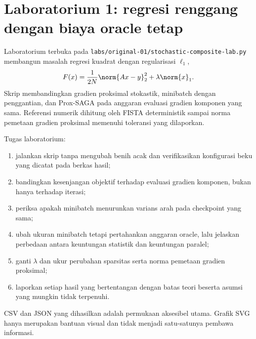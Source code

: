 \section{Laboratorium 1: regresi renggang dengan biaya oracle tetap}
\label{orig01:section:lab}

Laboratorium terbuka pada
\texttt{labs/original-01/stochastic-composite-lab.py} membangun masalah
regresi kuadrat dengan regularisasi $\ell_1$,
\begin{equation}
  \label{orig01:eq:lab-objective}
  F(x)=\frac{1}{2N}\norm{Ax-y}_2^2+\lambda\norm{x}_1.
\end{equation}
Skrip membandingkan gradien proksimal stokastik, minibatch dengan penggantian,
dan Prox-SAGA pada anggaran evaluasi gradien komponen yang sama. Referensi
numerik dihitung oleh FISTA deterministik sampai norma pemetaan gradien
proksimal memenuhi toleransi yang dilaporkan.

Tugas laboratorium:
\begin{enumerate}
  \item jalankan skrip tanpa mengubah benih acak dan verifikasikan konfigurasi
    beku yang dicatat pada berkas hasil;
  \item bandingkan kesenjangan objektif terhadap evaluasi gradien komponen,
    bukan hanya terhadap iterasi;
  \item periksa apakah minibatch menurunkan varians arah pada checkpoint yang
    sama;
  \item ubah ukuran minibatch tetapi pertahankan anggaran oracle, lalu
    jelaskan perbedaan antara keuntungan statistik dan keuntungan paralel;
  \item ganti $\lambda$ dan ukur perubahan sparsitas serta norma pemetaan
    gradien proksimal;
  \item laporkan setiap hasil yang bertentangan dengan batas teori beserta
    asumsi yang mungkin tidak terpenuhi.
\end{enumerate}
CSV dan JSON yang dihasilkan adalah permukaan aksesibel utama. Grafik SVG
hanya merupakan bantuan visual dan tidak menjadi satu-satunya pembawa
informasi.

